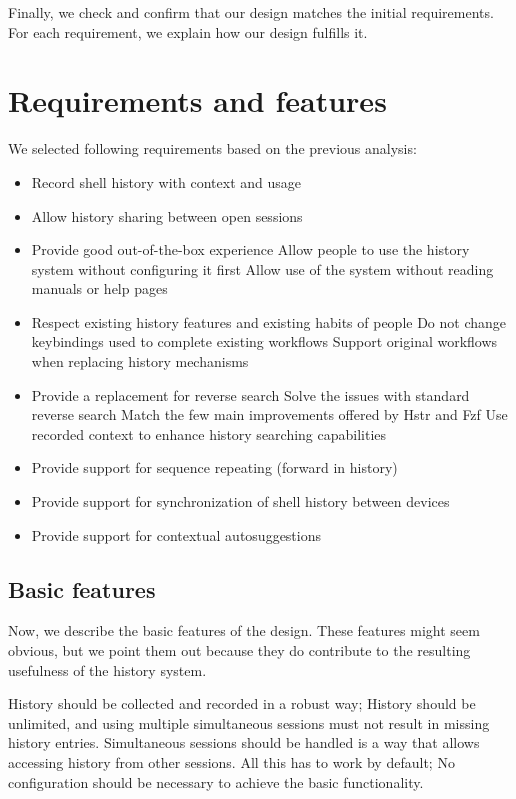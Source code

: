Finally, we check and confirm that our design matches the initial requirements. For each requirement, we explain how our design fulfills it.


\newpage
\section{Requirements and features}


We selected following requirements based on the previous analysis:

\begin{itemize}
\item Record shell history with context and usage
\item Allow history sharing between open sessions
\item Provide good out-of-the-box experience
\subitem Allow people to use the history system without configuring it first
\subitem Allow use of the system without reading manuals or help pages
\item Respect existing history features and existing habits of people
\subitem Do not change keybindings used to complete existing workflows
\subitem Support original workflows when replacing history mechanisms
\item Provide a replacement for reverse search
\subitem Solve the issues with standard reverse search
\subitem Match the few main improvements offered by Hstr and Fzf
\subitem Use recorded context to enhance history searching capabilities
\item Provide support for sequence repeating (forward in history)
\item Provide support for synchronization of shell history between devices
\item Provide support for contextual autosuggestions
\end{itemize}



\subsection{Basic features}

Now, we describe the basic features of the design. These features might seem obvious, but we point them out because they do contribute to the resulting usefulness of the history system.

History should be collected and recorded in a robust way; History should be unlimited, and using multiple simultaneous sessions must not result in missing history entries. 
Simultaneous sessions should be handled is a way that allows accessing history from other sessions.
All this has to work by default; No configuration should be necessary to achieve the basic functionality. 

